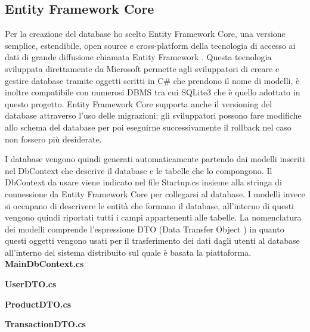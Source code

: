 \subsection{Entity Framework Core}
Per la creazione del database ho scelto Entity Framework Core, una versione semplice, estendibile, open source e cross-platform della tecnologia di accesso ai dati di grande diffusione chiamata Entity Framework  \cite{EFcore}. Questa tecnologia sviluppata direttamente da Microsoft permette agli sviluppatori di creare e gestire database tramite oggetti scritti in C\# che prendono il nome di modelli, è inoltre compatibile con numerosi DBMS tra cui SQLite3 che è quello adottato in questo progetto. Entity Framework Core supporta anche il versioning del database attraverso l'uso delle migrazioni: gli sviluppatori possono fare modifiche allo schema del database per poi eseguirne successivamente il rollback nel caso non fossero più desiderate. 
\medskip

I database vengono quindi generati automaticamente partendo dai modelli inseriti nel DbContext che descrive il database e le tabelle che lo compongono. Il DbContext da usare viene indicato nel file Startup.cs insieme alla stringa di connessione da Entity Framework Core per collegarsi al database. I modelli invece si occupano di descrivere le entità che formano il database, all'interno di questi vengono quindi riportati tutti i campi appartenenti alle tabelle. La nomenclatura dei modelli comprende l'espressione DTO (Data Transfer Object \cite{DTO}) in quanto questi oggetti vengono usati per il trasferimento dei dati dagli utenti al database all'interno del sistema distribuito sul quale è basata la piattaforma. 
\bigskip
\clearpage
\textbf{MainDbContext.cs}

\bigskip

\textbf{UserDTO.cs}

\bigskip

\textbf{ProductDTO.cs}

\bigskip

\textbf{TransactionDTO.cs}



